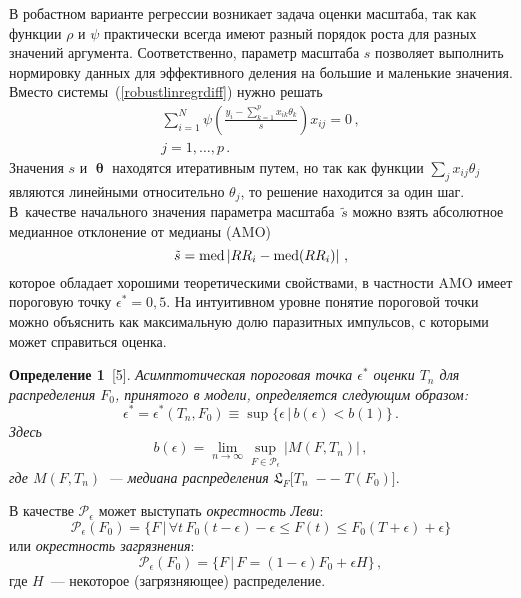 \begin{multicols}{2}
В робастном варианте регрессии возникает задача оценки масштаба,
так как функции $\rho$ и $\psi$ практически всегда имеют разный
порядок роста для разных значений аргумента. Соответственно,
параметр масштаба $s$ позволяет выполнить нормировку данных для
эффективного деления на большие и маленькие значения. Вместо
системы~(\ref{robustlinregrdiff}) нужно решать
\begin{multline}
\label{robustlinregrdiffscale}
\sum_{i=1}^N\psi\left(\frac{y_i-\sum_{k=1}^p
x_{ik}\theta_k}{s}\right)x_{ij}=0\,, \\
 j=1,\ldots,p\,.
\end{multline}
Значения $s$ и $\bm\uptheta$ находятся итеративным
путем, но так как функции $\sum\limits_j x_{ij}\theta_j$ являются
линейными относительно $\theta_j$, то решение находится за один
шаг. В~качестве начального значения параметра масштаба~$\tilde{s}$
можно взять абсолютное медианное отклонение от медианы (AMO)
\begin{equation*}
\tilde{s} =
\textrm{med}\left|RR_i-\textrm{med}(RR_i)\right|\,,
\end{equation*}
которое обладает
хорошими теоретическими свойствами, в частности AMO имеет
пороговую точку $\epsilon^*=0{,}5$. На интуитивном уровне понятие
пороговой точки можно объяснить как максимальную долю паразитных
импульсов, с которыми может справиться оценка.

\medskip

\noindent
{\bf Определение 1}~[5]. %
 {\it
Асимптотическая пороговая точка $\epsilon^*$ оценки $T_n$ для
распределения $F_0$, принятого в модели, определяется следующим
образом:
\begin{equation*}
\epsilon^* =
\epsilon^*(T_n,F_0)\equiv\sup\{\epsilon\,|\,b(\epsilon)<b(1)\}\,.
\end{equation*}
Здесь
\begin{equation*}
b(\epsilon)=\lim_{n\rightarrow\infty}\sup_{F\in\mathcal{P}_\epsilon}|M(F,T_n)|\,,
\end{equation*}
где $M(F,T_n)$~--- медиана распределения}
$\mathfrak{L}_F[T_n\;-$\linebreak $-\;T(F_0)]$.

\smallskip

В качестве
$\mathcal{P}_\epsilon$ может выступать \emph{окрестность}\linebreak \emph{ Леви}:
\begin{equation*}
\mathcal{P}_\epsilon(F_0)=\{F\,|\,\forall
t\,F_0(t-\epsilon)-\epsilon\leq F(t)\leq
F_0(T+\epsilon)+\epsilon\} 
\end{equation*}
или \textit{окрестность
загрязнения}:
\begin{equation*}
\mathcal{P}_\epsilon(F_0)=\{F\,|\,F=(1-\epsilon)F_0+\epsilon H\}\,,
\end{equation*}
где $H$~--- некоторое (загрязняющее) распределение.


\end{multicols}
